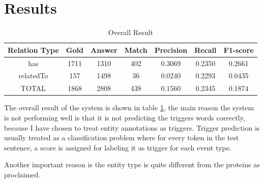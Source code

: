 \section{Results}
\begin{table}[h]
	\caption{Overall Result}
	\centering
	\label{table:overall_result}
	\begin{tabular}{|c | c c |c c c c |}
		\hline 
		{Relation Type} 
		& Gold & Answer  & Match  & Precision & Recall & F1-score\\ 
		\hline
		has  & 1711 & 1310 & 402 & 0.3069 & 0.2350 & 0.2661 \\
		
		relatedTo & 157 & 1498 &  36 & 0.0240 & 0.2293 & 0.0435\\
		\hline 
		TOTAL  & 1868 & 2808 & 438 & 0.1560 & 0.2345 & 0.1874 \\
		\hline 
	\end{tabular}
\end{table}
The overall result of the system is shown in table \ref{table:overall_result}, the main reason the system is not performing well is that it is not predicting the triggers words correctly, because I have chosen to treat entity annotations as triggers. Trigger prediction is usually treated as a classification problem where for every token in the test sentence, a score is assigned for labeling it as trigger for each event type. 

Another important reason is the entity type is quite different from the proteins as proclaimed. 